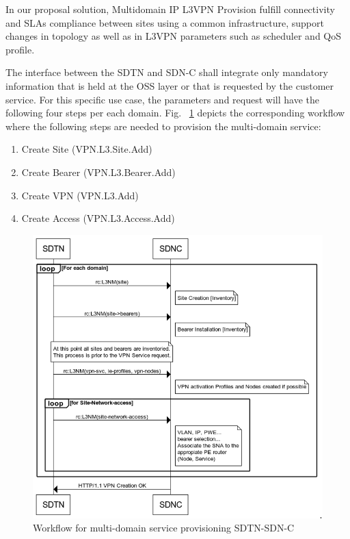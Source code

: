 \documentclass[a4paper,fleqn]{cas-dc}
\begin{document}
In our proposal solution, Multidomain IP L3VPN Provision fulfill connectivity and SLAs compliance between sites using a common infrastructure, support changes in topology as well as in L3VPN parameters such as scheduler and QoS profile. 

The interface between the SDTN and SDN-C shall integrate only mandatory information that is held at the OSS layer or that is requested by the customer service. For this specific use case, the parameters and request will have the following four steps per each domain. Fig.  ~\ref{FIG:multidomain_service_provisioning_workflow} depicts the corresponding workflow where the following steps are needed to provision the multi-domain service:
\begin{enumerate}
    \item Create Site (VPN.L3.Site.Add)
    \item Create Bearer (VPN.L3.Bearer.Add)
    \item Create VPN (VPN.L3.Add)
    \item Create Access (VPN.L3.Access.Add)
\end{enumerate}

\begin{figure}
	\centering
		\includegraphics[width=\linewidth]{figs/multidomain_service_provisioning_workflow.png}
	\caption{Workflow for multi-domain service provisioning SDTN-SDN-C}
	\label{FIG:multidomain_service_provisioning_workflow}
\end{figure}
\end{document}
